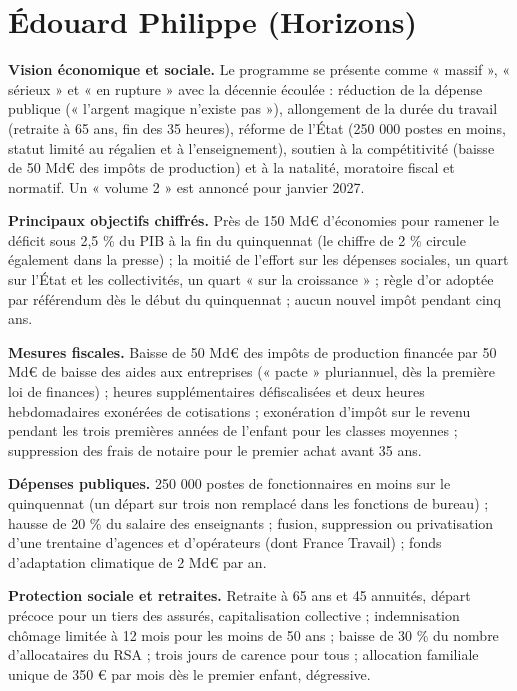 \documentclass[
  11pt,
  11pt,
  a4paper,
  openany]{book}
\begin{document}
\hypertarget{sec:prog-horizons}{%
\section{Édouard Philippe (Horizons)}\label{sec:prog-horizons}}

\textbf{Vision économique et sociale.} Le programme se présente comme «
massif », « sérieux » et « en rupture » avec la décennie écoulée :
réduction de la dépense publique (« l'argent magique n'existe pas »),
allongement de la durée du travail (retraite à 65 ans, fin des 35
heures), réforme de l'État (250 000 postes en moins, statut limité au
régalien et à l'enseignement), soutien à la compétitivité (baisse de 50
Md€ des impôts de production) et à la natalité, moratoire fiscal et
normatif. Un « volume 2 » est annoncé pour janvier 2027.

\textbf{Principaux objectifs chiffrés.} Près de 150 Md€ d'économies pour
ramener le déficit sous 2,5 \% du PIB à la fin du quinquennat (le
chiffre de 2 \% circule également dans la presse) ; la moitié de
l'effort sur les dépenses sociales, un quart sur l'État et les
collectivités, un quart « sur la croissance » ; règle d'or adoptée par
référendum dès le début du quinquennat ; aucun nouvel impôt pendant cinq
ans.

\textbf{Mesures fiscales.} Baisse de 50 Md€ des impôts de production
financée par 50 Md€ de baisse des aides aux entreprises (« pacte »
pluriannuel, dès la première loi de finances) ; heures supplémentaires
défiscalisées et deux heures hebdomadaires exonérées de cotisations ;
exonération d'impôt sur le revenu pendant les trois premières années de
l'enfant pour les classes moyennes ; suppression des frais de notaire
pour le premier achat avant 35 ans.

\textbf{Dépenses publiques.} 250 000 postes de fonctionnaires en moins
sur le quinquennat (un départ sur trois non remplacé dans les fonctions
de bureau) ; hausse de 20 \% du salaire des enseignants ; fusion,
suppression ou privatisation d'une trentaine d'agences et d'opérateurs
(dont France Travail) ; fonds d'adaptation climatique de 2 Md€ par an.

\textbf{Protection sociale et retraites.} Retraite à 65 ans et 45
annuités, départ précoce pour un tiers des assurés, capitalisation
collective ; indemnisation chômage limitée à 12 mois pour les moins de
50 ans ; baisse de 30 \% du nombre d'allocataires du RSA ; trois jours
de carence pour tous ; allocation familiale unique de 350 € par mois dès
le premier enfant, dégressive.
\end{document}
